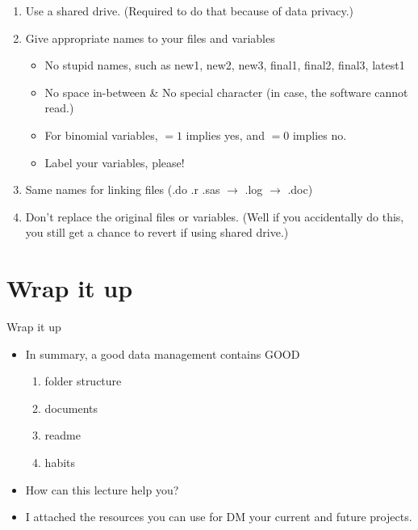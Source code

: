 \begin{frame}{\secname}

\begin{enumerate}[<+->]
	\item Use a shared drive. (Required to do that because of data privacy.)
	\item Give appropriate names to your files and variables	
		\begin{itemize}[<+->]
			\item No stupid names, such as new1, new2, new3, final1, final2, final3, latest1
			\item No space in-between \& No special character (in case, the software cannot read.)
			\item For binomial variables, $=1$ implies yes, and $=0$ implies no.
			\item Label your variables, please!
		\end{itemize}
	\item Same names for linking files (.do .r .sas $\rightarrow$ .log $\rightarrow$ .doc)
	\item Don't replace the original files or variables. (Well if you accidentally do this, you still get a chance to revert if using shared drive.)
\end{enumerate}
	
\end{frame}


\section{Wrap it up}
\begin{frame}{Wrap it up}
\begin{itemize}
\item In summary, a good data management contains GOOD
\begin{enumerate}
	\item folder structure
	\item documents
	\item readme
	\item habits
\end{enumerate}

\item How can this lecture help you? \\
\item I attached the resources you can use for DM your current and future projects.
\end{itemize}
\end{frame}

